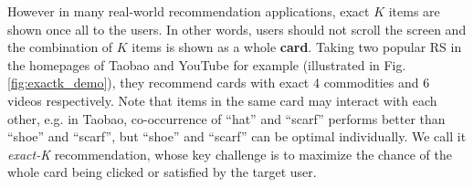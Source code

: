 However in many real-world recommendation applications,
exact $K$ items are shown once all to the users. 
In other words, users should not scroll the screen and the combination of $K$ items is shown as a whole \textbf{card}. 
Taking two popular RS in the homepages of Taobao
and YouTube
for example
(illustrated in Fig. \ref{fig:exactk_demo}), they recommend cards with exact 4 commodities and 6 videos respectively.
Note that items in the same card may interact with each other, e.g. in Taobao, co-occurrence of ``hat'' and ``scarf'' performs better than ``shoe'' and ``scarf'', but ``shoe'' and ``scarf'' can be optimal individually.
We call it \emph{exact-K} recommendation, 
whose key challenge is to maximize the chance of the whole card being clicked or satisfied by the target user. 
